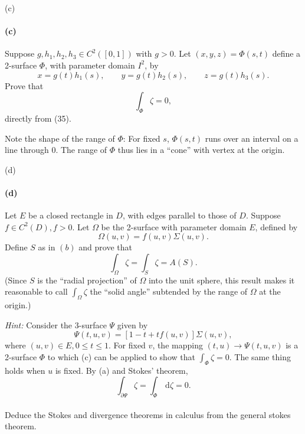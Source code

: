 \documentclass[12pt]{article}
\newenvironment{fullbox}{\begin{lrbox}{\savefullbox}\begin{minipage}{\dimexpr\textwidth-2\fboxsep\relax}}{\end{minipage}\end{lrbox}\begin{center}\framebox[\textwidth]{\usebox{\savefullbox}}\end{center}}
\newenvironment{pbox}[1][]{\begin{fullbox}\ifx#1\empty\else\paragraph{#1}\fi}{\end{fullbox}}
\newcommand{\<}{\langle}
\renewcommand{\>}{\rangle}
\newcommand{\dd}[1]{\,\mathrm{d}#1}
\begin{document}
\begin{pbox}[(c)]
    Suppose $g,h_1,h_2,h_3 \in C^2([0,1])$ with $g>0$. Let $(x,y,z)=\Phi(s,t)$ define a 2-surface $\Phi$, with parameter domain $I^2$, by
    \[x=g(t)h_1(s), \qquad y=g(t)h_2(s), \qquad z=g(t)h_3(s).\]
    Prove that
    \[\int_{\Phi}\zeta = 0,\]
    directly from (35).
    
    Note the shape of the range of $\Phi$: For fixed $s$, $\Phi(s,t)$ runs over an interval on a line through 0. The range of $\Phi$ thus lies in a ``cone'' with vertex at the origin.
\end{pbox}

\begin{pbox}[(d)]
    Let $E$ be a closed rectangle in $D$, with edges parallel to those of $D$. Suppose $f\in C^2(D), f>0$. Let $\Omega$ be the 2-surface with parameter domain $E$, defined by
    \[\Omega(u,v)=f(u,v)\Sigma(u,v).\]
    Define $S$ as in $(b)$ and prove that
    \[\int_\Omega \zeta = \int_S \zeta = A(S).\]
    (Since $S$ is the ``radial projection'' of $\Omega$ into the unit sphere, this result makes it reasonable to call $\int_\Omega \zeta$ the ``solid angle'' subtended by the range of $\Omega$ at the origin.)
    
    \textit{Hint:} Consider the 3-surface $\Psi$ given by
    \[\Psi(t,u,v) = [1-t + tf(u,v)]\Sigma(u,v),\]
    where $(u,v)\in E, 0\leq t\leq 1$. For fixed $v$, the mapping $(t,u)\to \Psi(t,u,v)$ is a 2-surface $\Phi$ to which (c) can be applied to show that $\int_\Phi \zeta = 0$. The same thing holds when $u$ is fixed. By (a) and Stokes' theorem,
    \[\int_{\partial \Psi} \zeta = \int_\Phi \dd{\zeta} = 0.\]
\end{pbox}


\begin{pbox}[]
    Deduce the Stokes and divergence theorems in calculus from the general stokes theorem.
\end{pbox}
\end{document}
